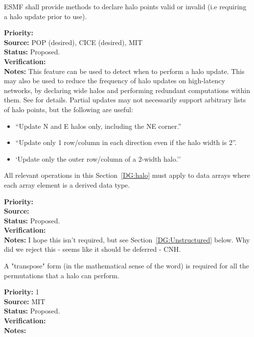 
ESMF shall provide methods to declare halo points valid or invalid
(i.e requiring a halo update prior to use).

\begin{reqlist}
{\bf Priority:} \\
{\bf Source:} POP (desired), CICE (desired), MIT \\
{\bf Status:} Proposed. \\
{\bf Verification:} \\
{\bf Notes:} This feature can be used to detect when to perform a halo
  update. This may also be used to reduce the frequency of halo
  updates on high-latency networks, by declaring wide halos and
  performing redundant computations within them. See \cite{ref:b2001}
  for details. Partial updates may not necessarily support
  arbitrary lists of halo points, but the following are useful:
  \begin{itemize}
  \item ``Update N and E halos only, including the NE corner.''
  \item ``Update only 1 row/column in each direction even if the halo
    width is 2''.
  \item `Update only the outer row/column of a 2-width halo.''
  \end{itemize}
\end{reqlist}


All relevant operations in this Section~\ref{DG:halo} must apply to
data arrays where each array element is a derived data type.

\begin{reqlist}
{\bf Priority:} \\
{\bf Source:} \\
{\bf Status:} Proposed. \\ 
{\bf Verification:} \\
{\bf Notes:} I hope this isn't required, but see
  Section~\ref{DG:Unstructured} below.
  Why did we reject this - seems like it should be deferred - CNH.
\end{reqlist}

A "transpose" form (in the mathematical sense of the word) is required
for all the permutations that a halo can perform.
\begin{reqlist}
{\bf Priority:} 1 \\ 
{\bf Source:}  MIT \\
{\bf Status:} Proposed. \\
{\bf Verification:} \\
{\bf Notes:}
\end{reqlist}

